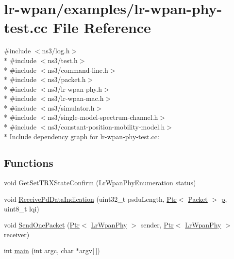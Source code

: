 \hypertarget{lr-wpan-phy-test_8cc}{}\section{lr-\/wpan/examples/lr-\/wpan-\/phy-\/test.cc File Reference}
\label{lr-wpan-phy-test_8cc}
{\ttfamily \#include $<$ns3/log.\+h$>$}\\*
{\ttfamily \#include $<$ns3/test.\+h$>$}\\*
{\ttfamily \#include $<$ns3/command-\/line.\+h$>$}\\*
{\ttfamily \#include $<$ns3/packet.\+h$>$}\\*
{\ttfamily \#include $<$ns3/lr-\/wpan-\/phy.\+h$>$}\\*
{\ttfamily \#include $<$ns3/lr-\/wpan-\/mac.\+h$>$}\\*
{\ttfamily \#include $<$ns3/simulator.\+h$>$}\\*
{\ttfamily \#include $<$ns3/single-\/model-\/spectrum-\/channel.\+h$>$}\\*
{\ttfamily \#include $<$ns3/constant-\/position-\/mobility-\/model.\+h$>$}\\*
Include dependency graph for lr-\/wpan-\/phy-\/test.cc\+:
\subsection*{Functions}
\begin{DoxyCompactItemize}
\item 
void \hyperlink{lr-wpan-phy-test_8cc_a23aec77831063efb6a3903cf1768523d}{Get\+Set\+T\+R\+X\+State\+Confirm} (\hyperlink{group__lr-wpan_ga6494269d13d45c511a07b7ccbb1de754}{Lr\+Wpan\+Phy\+Enumeration} status)
\item 
void \hyperlink{lr-wpan-phy-test_8cc_a5c882b9e81cab78055926d4c983e03ec}{Receive\+Pd\+Data\+Indication} (uint32\+\_\+t psdu\+Length, \hyperlink{classns3_1_1Ptr}{Ptr}$<$ \hyperlink{classns3_1_1Packet}{Packet} $>$ \hyperlink{lte__link__budget__x2__handover__measures_8m_ac9de518908a968428863f829398a4e62}{p}, uint8\+\_\+t lqi)
\item 
void \hyperlink{lr-wpan-phy-test_8cc_a297aa23c603d090d628885484e785ebf}{Send\+One\+Packet} (\hyperlink{classns3_1_1Ptr}{Ptr}$<$ \hyperlink{classns3_1_1LrWpanPhy}{Lr\+Wpan\+Phy} $>$ sender, \hyperlink{classns3_1_1Ptr}{Ptr}$<$ \hyperlink{classns3_1_1LrWpanPhy}{Lr\+Wpan\+Phy} $>$ receiver)
\item 
int \hyperlink{lr-wpan-phy-test_8cc_a0ddf1224851353fc92bfbff6f499fa97}{main} (int argc, char $\ast$argv\mbox{[}$\,$\mbox{]})
\end{DoxyCompactItemize}


